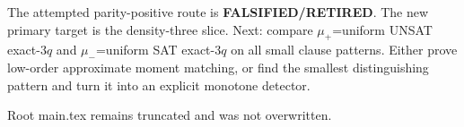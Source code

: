 \documentclass[11pt]{article}
\begin{document}
The attempted parity-positive route is \textbf{FALSIFIED/RETIRED}. The new primary target is the density-three slice. Next: compare $\mu_+$=uniform UNSAT exact-$3q$ and $\mu_-$=uniform SAT exact-$3q$ on all small clause patterns. Either prove low-order approximate moment matching, or find the smallest distinguishing pattern and turn it into an explicit monotone detector.

Root main.tex remains truncated and was not overwritten.
\end{document}
